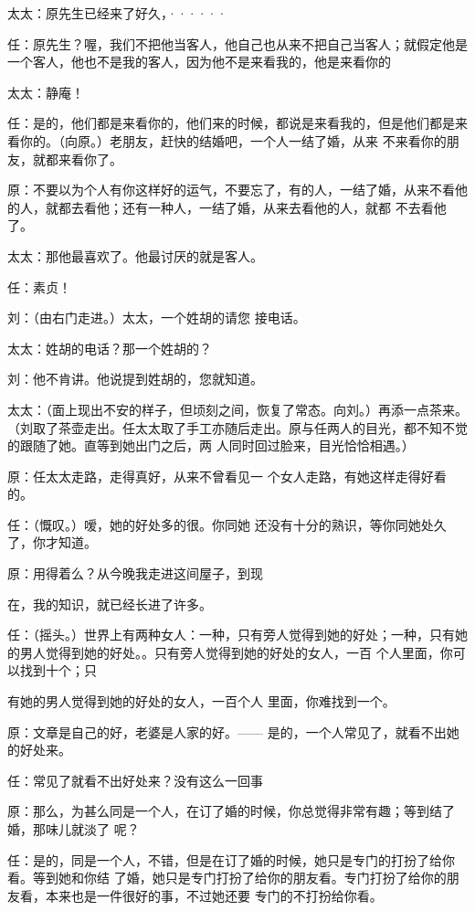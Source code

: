 \documentclass{article}
\begin{document}
\newpage


太太：原先生已经来了好久，······ 

任：原先生？喔，我们不把他当客人，他自己也从来不把自己当客人；就假定他是一个客人，他也不是我的客人，因为他不是来看我的，他是来看你的


太太：静庵！ 

任：是的，他们都是来看你的，他们来的时候，都说是来看我的，但是他们都是来看你的。（向原。）老朋友，赶快的结婚吧，一个人一结了婚，从来
不来看你的朋友，就都来看你了。 

原：不要以为个人有你这样好的运气，不要忘了，有的人，一结了婚，从来不看他的人，就都去看他；还有一种人，一结了婚，从来去看他的人，就都
不去看他了。 

太太：那他最喜欢了。他最讨厌的就是客人。


\newpage

任：素贞！ 

刘：（由右门走进。）太太，一个姓胡的请您
接电话。 


太太：姓胡的电话？那一个姓胡的？ 

刘：他不肯讲。他说提到姓胡的，您就知道。

太太：（面上现出不安的样子，但顷刻之间，恢复了常态。向刘。）再添一点茶来。（刘取了茶壶走出。任太太取了手工亦随后走出。原与任两人的目光，都不知不觉的跟随了她。直等到她出门之后，两
人同时回过脸来，目光恰恰相遇。） 

原：任太太走路，走得真好，从来不曾看见一
个女人走路，有她这样走得好看的。 

任：（慨叹。）嗳，她的好处多的很。你同她
还没有十分的熟识，等你同她处久了，你才知道。 

原：用得着么？从今晚我走进这间屋子，到现
\newpage

在，我的知识，就已经长进了许多。 

任：（摇头。）世界上有两种女人：一种，只有旁人觉得到她的好处；一种，只有她的男人觉得到她的好处。。只有旁人觉得到她的好处的女人，一百
个人里面，你可以找到十个；只 

有她的男人觉得到她的好处的女人，一百个人
里面，你难找到一个。 

原：文章是自己的好，老婆是人家的好。——
是的，一个人常见了，就看不出她的好处来。 

任：常见了就看不出好处来？没有这么一回事

原：那么，为甚么同是一个人，在订了婚的时候，你总觉得非常有趣；等到结了婚，那味儿就淡了
呢？ 

任：是的，同是一个人，不错，但是在订了婚的时候，她只是专门的打扮了给你看。等到她和你结
\newpage
了婚，她只是专门打扮了给你的朋友看。专门打扮了给你的朋友看，本来也是一件很好的事，不过她还要
专门的不打扮给你看。 
\end{document}
